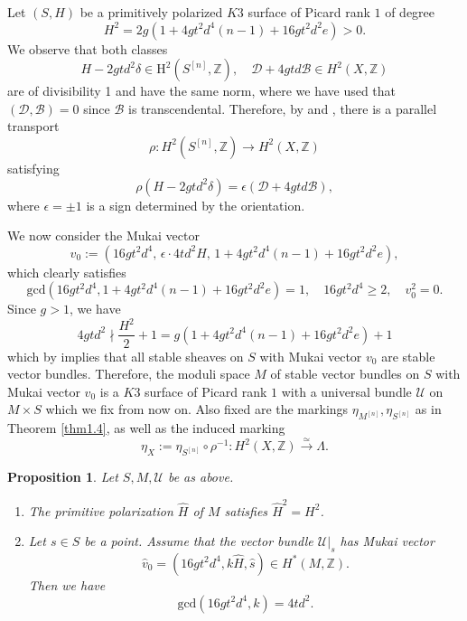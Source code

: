\documentclass[11pt]{amsart}
\theoremstyle{plain}
\newtheorem{prop}[thm]{Proposition}
\theoremstyle{definition}
\theoremstyle{remark}
\newcommand{\BZ}{{\mathbb{Z}}}
\newcommand{\CB}{{\mathcal B}}
\newcommand{\CD}{{\mathcal D}}
\newcommand{\CU}{{\mathcal U}}
\begin{document}
Let $(S, H)$ be a primitively polarized $K3$ surface of Picard rank $1$ of degree
\[
H^2 = 2g\left(1+ 4gt^2d^4(n-1) +16gt^2d^2e\right) > 0.
\]
We observe that both classes
\[
H - 2gtd^2\delta\in \mathrm H^2(S^{[n]}, \BZ), \quad \CD+ 4gtd \CB \in H^2(X,\BZ)
\]
are of divisibility 1 and have the same norm, where we have used that $(\CD, \CB)=0$ since $\CB$ is transcendental. Therefore, by \cite[Example 3.8]{GHS} and \cite[Theorem 9.8]{Torelli}, there is a parallel transport
    \[
    \rho: H^2(S^{[n]}, \BZ)  \to H^2(X, \BZ)
    \]
satisfying
\begin{equation} \label{eq:rhorho}
\rho(H - 2gtd^2\delta) = \epsilon (\CD+ 4gtd \CB),
\end{equation}
where $\epsilon = \pm 1$ is a sign determined by the orientation. 

We now consider the Mukai vector
\[
v_0:= \left(16gt^2d^4, \, \epsilon\cdot  4td^2H, \, 1+ 4gt^2d^4(n-1) +16gt^2d^2e\right),
\]
which clearly satisfies
\[
\mathrm{gcd}\left(16gt^2d^4, 1+ 4gt^2d^4(n-1) +16gt^2d^2e\right)=1, \quad 16gt^2d^4 \geq 2, \quad v_0^2 = 0.
\]
Since $g > 1$, we have
\[
4gtd^2 \nmid \frac{H^2}{2} + 1 = g\left(1+ 4gt^2d^4(n-1) +16gt^2d^2e\right) + 1
\]
which by \cite[Lemma 1.2]{Y} implies that all stable sheaves on $S$ with Mukai vector $v_0$ are stable vector bundles. Therefore, the moduli space $M$ of stable vector bundles on $S$ with Mukai vector $v_0$ is a $K3$ surface of Picard rank $1$ with a universal bundle $\CU$ on $M \times S$ which we fix from now on. Also fixed are the markings $\eta_{M^{[n]}}, \eta_{S^{[n]}}$ as in Theorem \ref{thm1.4}, as well as the induced marking
\[
\eta_X := \eta_{S^{[n]}} \circ \rho^{-1}: H^2(X, \BZ) \xrightarrow{\simeq} \Lambda.
\]


\begin{prop}\label{prop2.3} Let $S, M, \CU$ be as above.
\begin{enumerate}
    \item[(a)] The primitive polarization $\widehat{H}$ of $M$ satisfies $\widehat{H}^2 = H^2$.
    \item[(b)] Let $s\in S$ be a point. Assume that the vector bundle $\CU|_s$ has Mukai vector 
    \[
    \widehat{v}_0 = (16gt^2d^4, k\widehat{H}, \widehat{s}) \in H^*(M, \BZ). 
    \]
    Then we have
    \[
    \mathrm{gcd}( 16gt^2d^4, k ) = 4td^2.
    \]
\end{enumerate}
\end{prop}
\end{document}
